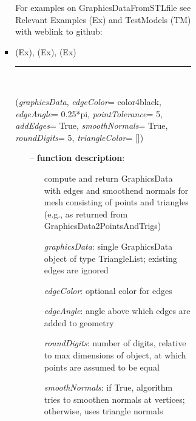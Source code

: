 \begin{itemize}[leftmargin=1.4cm]
\begin{itemize}[leftmargin=1.4cm]
\begin{itemize}[leftmargin=1.4cm]
\begin{itemize}[leftmargin=0.5cm]
\begin{itemize}[leftmargin=1.4cm]
\begin{itemize}[leftmargin=1.4cm]
\begin{itemize}[leftmargin=0.5cm]
\begin{itemize}[leftmargin=1.4cm]
\begin{itemize}[leftmargin=0.5cm]
\begin{itemize}[leftmargin=0.7cm]
\vspace{12pt}\end{itemize}
%
%
\noindent For examples on GraphicsDataFromSTLfile see Relevant Examples (Ex) and TestModels (TM) with weblink to github:
\bi
 \item \footnotesize {} (Ex), 
 (Ex), 
 (Ex)
\ei

%
\noindent\rule{8cm}{0.75pt}\vspace{1pt} \\ 
\begin{flushleft}
\label{sec:graphicsDataUtilities:AddEdgesAndSmoothenNormals}
({\it graphicsData}, {\it edgeColor}= color4black, {\it edgeAngle}= 0.25*pi, {\it pointTolerance}= 5, {\it addEdges}= True, {\it smoothNormals}= True, {\it roundDigits}= 5, {\it triangleColor}= [])
\end{flushleft}
\setlength{\itemindent}{0.7cm}
\begin{itemize}[leftmargin=0.7cm]
\item[--]
{\bf function description}: \vspace{-6pt}
\begin{itemize}[leftmargin=1.2cm]
\setlength{\itemindent}{-0.7cm}
\item[]compute and return GraphicsData with edges and smoothend normals for mesh consisting of points and triangles (e.g., as returned from GraphicsData2PointsAndTrigs)
\item[]{\it graphicsData}: single GraphicsData object of type TriangleList; existing edges are ignored
\item[]{\it edgeColor}: optional color for edges
\item[]{\it edgeAngle}: angle above which edges are added to geometry
\item[]{\it roundDigits}: number of digits, relative to max dimensions of object, at which points are assumed to be equal
\item[]{\it smoothNormals}: if True, algorithm tries to smoothen normals at vertices; otherwise, uses triangle normals

\end{itemize}
\end{itemize}
\end{itemize}
\end{itemize}
\end{itemize}
\end{itemize}
\end{itemize}
\end{itemize}
\end{itemize}
\end{itemize}
\end{itemize}
